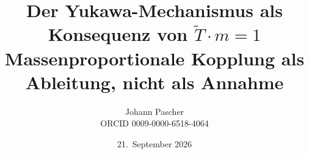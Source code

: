 \documentclass[11pt,a4paper]{report}
\title{Der Yukawa-Mechanismus als Konsequenz von $\tilde T\cdot m=1$\\[0.5em]\large Massenproportionale Kopplung als Ableitung, nicht als Annahme}
\date{21.~September 2026}
\author{Johann Pascher\\\small ORCID 0009-0000-6518-4064}
\begin{document}
\renewcommand{\thechapter}{}
\renewcommand{\thesection}{\arabic{section}}
\maketitle
\tableofcontents

\end{document}
